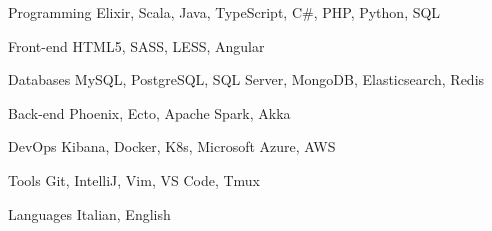 \documentclass{resume} %
\begin{document}


\begin{cvSkills}


  \cvSkill
    {Programming}
    {Elixir, Scala, Java, TypeScript, C\#, PHP, Python, SQL}


  \cvSkill
    {Front-end}
    {HTML5, SASS, LESS, Angular}


  \cvSkill
    {Databases}
    {MySQL, PostgreSQL, SQL Server, MongoDB, Elasticsearch, Redis}


  \cvSkill
    {Back-end}
    {Phoenix, Ecto, Apache Spark, Akka}


  \cvSkill
    {DevOps}
    {Kibana, Docker, K8s, Microsoft Azure, AWS}


  \cvSkill
    {Tools}
    {Git, IntelliJ, Vim, VS Code, Tmux}


  \cvSkill
    {}{}


  \cvSkill
    {Languages}
    {Italian, English}


\end{cvSkills}

\end{document}
